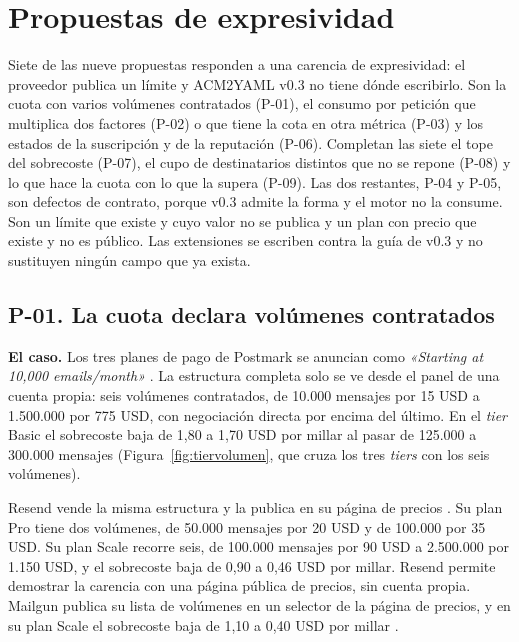 \section{Propuestas de expresividad}
\label{sec:esquema:expresividad}\label{sec:evolucion:expresividad}

Siete de las nueve propuestas responden a una carencia de expresividad: el proveedor publica un límite y ACM2YAML v0.3 no tiene dónde escribirlo.
Son la cuota con varios volúmenes contratados (P-01), el consumo por petición que multiplica dos factores (P-02) o que tiene la cota en otra métrica (P-03) y los estados de la suscripción y de la reputación (P-06).
Completan las siete el tope del sobrecoste (P-07), el cupo de destinatarios distintos que no se repone (P-08) y lo que hace la cuota con lo que la supera (P-09).
Las dos restantes, P-04 y P-05, son defectos de contrato, porque v0.3 admite la forma y el motor no la consume.
Son un límite que existe y cuyo valor no se publica y un plan con precio que existe y no es público.
Las extensiones se escriben contra la guía de v0.3 \citep{apisconsumptionmodel} y no sustituyen ningún campo que ya exista.

\subsection{P-01. La cuota declara volúmenes contratados}
\label{subsec:evolucion:p01}

\textbf{El caso.} Los tres planes de pago de Postmark se anuncian como \textit{«Starting at 10,000 emails/month»} \citep{postmarkpricing}.
La estructura completa solo se ve desde el panel de una cuenta propia: seis volúmenes contratados, de 10.000 mensajes por 15 USD a 1.500.000 por 775 USD, con negociación directa por encima del último.
En el \textit{tier} Basic el sobrecoste baja de 1,80 a 1,70 USD por millar al pasar de 125.000 a 300.000 mensajes (Figura~\ref{fig:tiervolumen}, que cruza los tres \textit{tiers} con los seis volúmenes).

Resend vende la misma estructura y la publica en su página de precios \citep{resendpricing}.
Su plan Pro tiene dos volúmenes, de 50.000 mensajes por 20 USD y de 100.000 por 35 USD.
Su plan Scale recorre seis, de 100.000 mensajes por 90 USD a 2.500.000 por 1.150 USD, y el sobrecoste baja de 0,90 a 0,46 USD por millar.
Resend permite demostrar la carencia con una página pública de precios, sin cuenta propia.
Mailgun publica su lista de volúmenes en un selector de la página de precios, y en su plan Scale el sobrecoste baja de 1,10 a 0,40 USD por millar \citep{mailgunpricing}.

